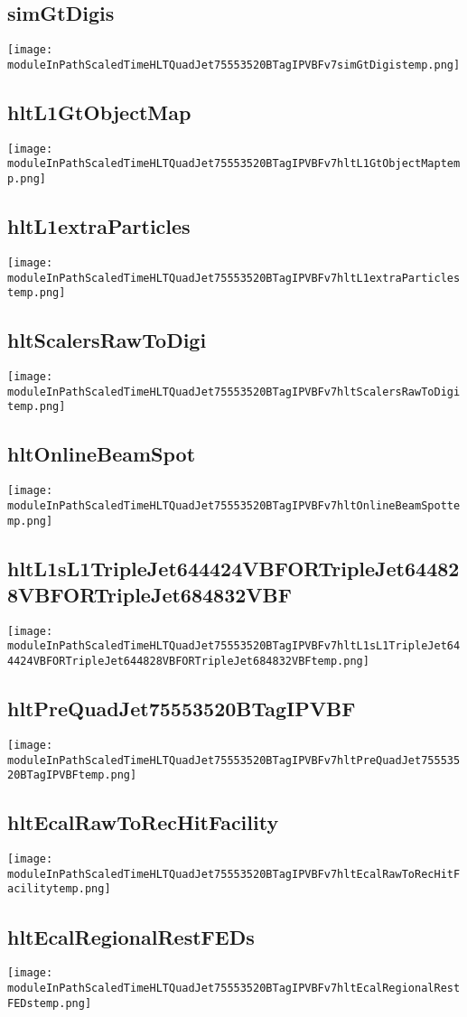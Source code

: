 \documentclass[10pt,a5paper,landscape]{report}
\begin{document}
\subsection{simGtDigis} \centering \texttt{[image: moduleInPathScaledTimeHLTQuadJet75553520BTagIPVBFv7simGtDigistemp.png]}
\subsection{hltL1GtObjectMap} \centering \texttt{[image: moduleInPathScaledTimeHLTQuadJet75553520BTagIPVBFv7hltL1GtObjectMaptemp.png]}
\subsection{hltL1extraParticles} \centering \texttt{[image: moduleInPathScaledTimeHLTQuadJet75553520BTagIPVBFv7hltL1extraParticlestemp.png]}
\subsection{hltScalersRawToDigi} \centering \texttt{[image: moduleInPathScaledTimeHLTQuadJet75553520BTagIPVBFv7hltScalersRawToDigitemp.png]}
\subsection{hltOnlineBeamSpot} \centering \texttt{[image: moduleInPathScaledTimeHLTQuadJet75553520BTagIPVBFv7hltOnlineBeamSpottemp.png]}
\subsection{hltL1sL1TripleJet644424VBFORTripleJet644828VBFORTripleJet684832VBF} \centering \texttt{[image: moduleInPathScaledTimeHLTQuadJet75553520BTagIPVBFv7hltL1sL1TripleJet644424VBFORTripleJet644828VBFORTripleJet684832VBFtemp.png]}
\subsection{hltPreQuadJet75553520BTagIPVBF} \centering \texttt{[image: moduleInPathScaledTimeHLTQuadJet75553520BTagIPVBFv7hltPreQuadJet75553520BTagIPVBFtemp.png]}
\subsection{hltEcalRawToRecHitFacility} \centering \texttt{[image: moduleInPathScaledTimeHLTQuadJet75553520BTagIPVBFv7hltEcalRawToRecHitFacilitytemp.png]}
\subsection{hltEcalRegionalRestFEDs} \centering \texttt{[image: moduleInPathScaledTimeHLTQuadJet75553520BTagIPVBFv7hltEcalRegionalRestFEDstemp.png]}
\end{document}
